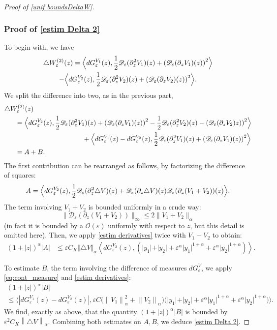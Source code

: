 \documentclass[JEP,XML,SOM,Unicode]{cedram}
\let\mathcal\mathscr
\newcommand{\cO}{\mathcal{O}}
\theoremstyle{plain}
\theoremstyle{definition}
\newcommand{\D}{\mathcal{D}_\eps}
\let\eps\varepsilon
\let\ds\displaystyle
\newcommand{\abs}[1]{\left\lvert#1\right\rvert}
\newcommand{\norm}[1]{\left\lVert#1\right\rVert}
\newcommand{\nalph}[1]{\left\lVert#1\right\rVert_\alpha}
\newcommand{\QV}{G_\eps^V}
\newcommand{\dQVA}{dG_\eps^{V_1}}
\newcommand{\dQVB}{dG_\eps^{V_2}}
\begin{document}
\begin{proof}[Proof of \cref{unif boundsDeltaW}]
\subsubsection*{Proof of \eqref{estim Delta 2}}
To begin with, we have
\begin{multline*}
\triangle W_\eps^{(2)}(z) =
\Bigl\langle \dQVA(z), \dfrac{1}{2} \D(\partial_z^2 V_1)(z) + \left(\D(\partial_z V_1)(z)\right)^2 \Bigr\rangle \\
-\Bigl\langle \dQVB(z), \dfrac{1}{2} \D(\partial_z^2 V_2)(z) + \left(\D(\partial_z V_2)(z)\right)^2 \Bigr\rangle.
\end{multline*}
We split the difference into two, as in the previous part,
\begin{align*}
\triangle W_\eps^{(2)}&(z)\\
& \hspace*{-5mm}=
\Bigl\langle \dQVB(z), \dfrac{1}{2} \D(\partial_z^2 V_1)(z) + \left(\D(\partial_z V_1)(z)\right)^2
- \dfrac{1}{2} \D(\partial_z^2 V_2)(z) - \left(\D(\partial_z V_2)z)\right)^2 \Bigr\rangle
\\
&\hspace*{3cm} + \Bigl\langle \dQVA(z)-\dQVB(z), \dfrac{1}{2} \D(\partial_z^2 V_1)(z) + \left(\D(\partial_z V_1)(z)\right)^2 \Bigr\rangle \\
&\hspace*{-5mm}= A + B.
\end{align*}
The first contribution can be rearranged as follows, by factorizing the difference of squares:
\begin{equation*}
A
= \Bigl\langle \dQVB(z),\dfrac{1}{2} \D(\partial_z^2 \triangle V)(z)
+ \D(\partial_z \triangle V)(z) \D(\partial_z (V_1+V_2))(z)
\Bigr\rangle.
\end{equation*}
The term involving $V_1+V_2$ is bounded uniformly in a crude way: $$\|\D(\partial_z (V_1+V_2))\|_\infty \leq 2 \|V_1+V_2\|_\alpha$$ (in fact it is bounded by a $\cO(\eps)$ uniformly with respect to $z$, but this detail is omitted here).
Then, we apply \cref{estim derivatives} twice with $V_1-V_2$ to obtain:
\begin{align*}
\ds (1+\abs{z})^\alpha \abs{A} & \leq \eps C_K \Vert \triangle V \Vert_\alpha \left\langle \dQVB(z), \left(\vert y_1 \vert+ \vert y_2 \vert +\eps^\alpha \vert y_1 \vert^{1+\alpha} + \eps^\alpha\vert y_2 \vert^{1+\alpha} \right) \right\rangle.
\end{align*}

To estimate $B$, the term involving the difference of measures $d\QV$, we apply \eqref{eq:cont_measure} and \cref{estim derivatives}:
\begin{multline}\label{eq:estim PSI}
(1+\abs{z})^\alpha \abs{B}\\
\leq \bigl\langle \abs{\dQVA(z)-\dQVB(z) }, \eps C \bigl (\norm{V_1}_\alpha^2 + \nalph{V_2} \bigr)\bigl(\vert y_1 \vert+ \vert y_2 \vert + \eps^\alpha\vert y_1 \vert^{1+\alpha} + \eps^\alpha\vert y_2 \vert^{1+\alpha} \bigr) \bigr\rangle.
\end{multline}
We find, exactly as above, that the quantity $(1+\abs{z})^\alpha \abs{B} $ is bounded by $\eps^2 C_K \norm{\triangle V}_\alpha$.
Combining both estimates on $A,B$, we deduce \cref{estim Delta 2}.


\end{proof}
\end{document}
